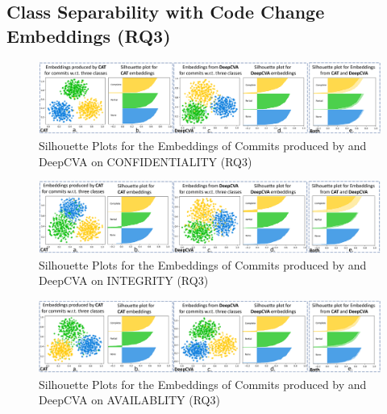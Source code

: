 \subsection{\bf Class Separability with Code Change Embeddings (RQ3)}
\label{sec:separation}


\begin{figure}[t]
	\centering
	\includegraphics[width=6.9in]{graphs/confidentiality}
        \vspace{-6pt}
	\caption{Silhouette Plots for the Embeddings of Commits produced by {\tool} and DeepCVA on CONFIDENTIALITY (RQ3)}
	\label{fig:confidentiality}
\end{figure}

\begin{figure}[t]
	\centering
	\includegraphics[width=6.9in]{graphs/integrity}
        \vspace{-6pt}
	\caption{Silhouette Plots for the Embeddings of Commits produced by {\tool} and DeepCVA on INTEGRITY (RQ3)}
	\label{fig:integrity}
\end{figure}

\begin{figure}[t]
	\centering
	\includegraphics[width=6.9in]{graphs/availability}
       \vspace{-6pt}
	\caption{Silhouette Plots for the Embeddings of Commits produced by {\tool} and DeepCVA on AVAILABLITY (RQ3)}
	\label{fig:availability}
\end{figure}

